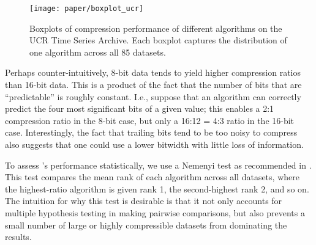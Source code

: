 \begin{figure}[h]
\begin{center}
    \texttt{[image: paper/boxplot\_ucr]}
    \caption{Boxplots of compression performance of different algorithms on the UCR Time Series Archive. Each boxplot captures the distribution of one algorithm across all 85 datasets.}
    \label{fig:ratioBox}
\end{center}
\end{figure}

Perhaps counter-intuitively, 8-bit data tends to yield higher compression ratios than 16-bit data. This is a product of the fact that the number of bits that are ``predictable'' is roughly constant. I.e., suppose that an algorithm can correctly predict the four most significant bits of a given value; this enables a 2:1 compression ratio in the 8-bit case, but only a 16:12 = 4:3 ratio in the 16-bit case. Interestingly, the fact that trailing bits tend to be too noisy to compress also suggests that one could use a lower bitwidth with little loss of information. %

To assess \mine's performance statistically, we use a Nemenyi test \cite{nemenyiTest} as recommended in \cite{cdDiagrams}. This test compares the mean rank of each algorithm across all datasets, where the highest-ratio algorithm is given rank 1, the second-highest rank 2, and so on. The intuition for why this test is desirable is that it not only accounts for multiple hypothesis testing in making pairwise comparisons, but also prevents a small number of large or highly compressible datasets from dominating the results.


